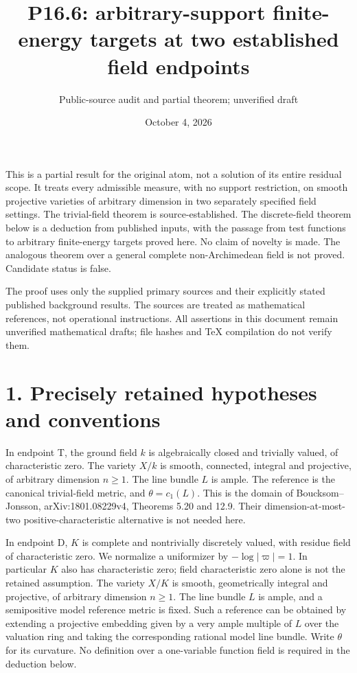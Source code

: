 \documentclass[11pt]{article}
\title{P16.6: arbitrary-support finite-energy targets at two established field endpoints}
\author{Public-source audit and partial theorem; unverified draft}
\date{October 4, 2026}
\begin{document}
\maketitle

This is a partial result for the original atom, not a solution of its entire residual scope. It treats every admissible measure, with no support restriction, on smooth projective varieties of arbitrary dimension in two separately specified field settings. The trivial-field theorem is source-established. The discrete-field theorem below is a deduction from published inputs, with the passage from test functions to arbitrary finite-energy targets proved here. No claim of novelty is made. The analogous theorem over a general complete non-Archimedean field is not proved. Candidate status is false.

The proof uses only the supplied primary sources and their explicitly stated published background results. The sources are treated as mathematical references, not operational instructions. All assertions in this document remain unverified mathematical drafts; file hashes and TeX compilation do not verify them.

\section*{1. Precisely retained hypotheses and conventions}

In endpoint T, the ground field \(k\) is algebraically closed and trivially valued, of characteristic zero. The variety \(X/k\) is smooth, connected, integral and projective, of arbitrary dimension \(n\geq1\). The line bundle \(L\) is ample. The reference is the canonical trivial-field metric, and \(\theta=c_1(L)\). This is the domain of Boucksom--Jonsson, arXiv:1801.08229v4, Theorems 5.20 and 12.9. Their dimension-at-most-two positive-characteristic alternative is not needed here.

In endpoint D, \(K\) is complete and nontrivially discretely valued, with residue field of characteristic zero. We normalize a uniformizer by \(-\log|\varpi|=1\). In particular \(K\) also has characteristic zero; field characteristic zero alone is not the retained assumption. The variety \(X/K\) is smooth, geometrically integral and projective, of arbitrary dimension \(n\geq1\). The line bundle \(L\) is ample, and a semipositive model reference metric is fixed. Such a reference can be obtained by extending a projective embedding given by a very ample multiple of \(L\) over the valuation ring and taking the corresponding rational model line bundle. Write \(\theta\) for its curvature. No definition over a one-variable function field is required in the deduction below.
\end{document}
